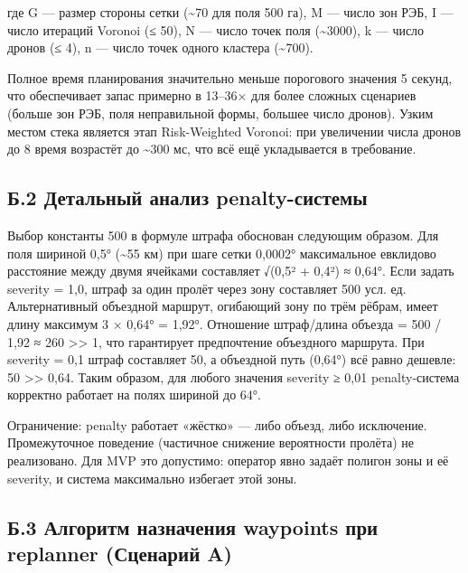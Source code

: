 \documentclass[14pt,a4paper]{extarticle}
\begin{document}
где G --- размер стороны сетки (\textasciitilde70 для поля 500 га), M --- число зон РЭБ, I --- число итераций Voronoi (≤ 50), N --- число точек поля (\textasciitilde3000), k --- число дронов (≤ 4), n --- число точек одного кластера (\textasciitilde700).

Полное время планирования значительно меньше порогового значения 5 секунд, что обеспечивает запас примерно в 13--36× для более сложных сценариев (больше зон РЭБ, поля неправильной формы, большее число дронов). Узким местом стека является этап Risk-Weighted Voronoi: при увеличении числа дронов до 8 время возрастёт до \textasciitilde300 мс, что всё ещё укладывается в требование.

\hypertarget{ux431.2-ux434ux435ux442ux430ux43bux44cux43dux44bux439-ux430ux43dux430ux43bux438ux437-penalty-ux441ux438ux441ux442ux435ux43cux44b}{%
\subsection{Б.2 Детальный анализ penalty-системы}\label{ux431.2-ux434ux435ux442ux430ux43bux44cux43dux44bux439-ux430ux43dux430ux43bux438ux437-penalty-ux441ux438ux441ux442ux435ux43cux44b}}

Выбор константы 500 в формуле штрафа обоснован следующим образом. Для поля шириной 0,5° (\textasciitilde55 км) при шаге сетки 0,0002° максимальное евклидово расстояние между двумя ячейками составляет √(0,5² + 0,4²) ≈ 0,64°. Если задать severity = 1,0, штраф за один пролёт через зону составляет 500 усл. ед. Альтернативный объездной маршрут, огибающий зону по трём рёбрам, имеет длину максимум 3 × 0,64° = 1,92°. Отношение штраф/длина объезда = 500 / 1,92 ≈ 260 \textgreater\textgreater{} 1, что гарантирует предпочтение объездного маршрута. При severity = 0,1 штраф составляет 50, а объездной путь (0,64°) всё равно дешевле: 50 \textgreater\textgreater{} 0,64. Таким образом, для любого значения severity ≥ 0,01 penalty-система корректно работает на полях шириной до 64°.

Ограничение: penalty работает «жёстко» --- либо объезд, либо исключение. Промежуточное поведение (частичное снижение вероятности пролёта) не реализовано. Для MVP это допустимо: оператор явно задаёт полигон зоны и её severity, и система максимально избегает этой зоны.

\hypertarget{ux431.3-ux430ux43bux433ux43eux440ux438ux442ux43c-ux43dux430ux437ux43dux430ux447ux435ux43dux438ux44f-waypoints-ux43fux440ux438-replanner-ux441ux446ux435ux43dux430ux440ux438ux439-a}{%
\subsection{Б.3 Алгоритм назначения waypoints при replanner (Сценарий A)}\label{ux431.3-ux430ux43bux433ux43eux440ux438ux442ux43c-ux43dux430ux437ux43dux430ux447ux435ux43dux438ux44f-waypoints-ux43fux440ux438-replanner-ux441ux446ux435ux43dux430ux440ux438ux439-a}}
\end{document}
